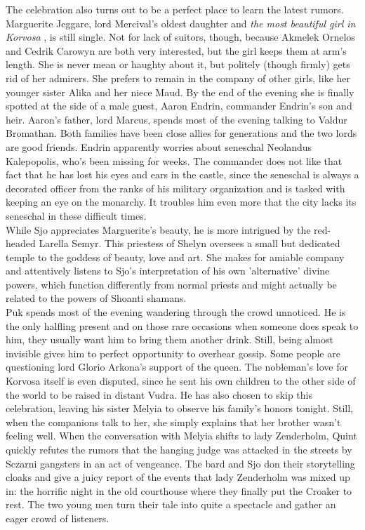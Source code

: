 The celebration also turns out to be a perfect place to learn the latest rumors. Marguerite Jeggare, lord Mercival's oldest daughter and {\itshape the most beautiful girl in Korvosa} , is still single. Not for lack of suitors, though, because Akmelek Ornelos and Cedrik Carowyn are both very interested, but the girl keeps them at arm's length. She is never mean or haughty about it, but politely (though firmly) gets rid of her admirers. She prefers to remain in the company of other girls, like her younger sister Alika and her niece Maud. By the end of the evening she is finally spotted at the side of a male guest, Aaron Endrin, commander Endrin's son and heir. Aaron's father, lord Marcus, spends most of the evening talking to Valdur Bromathan. Both families have been close allies for generations and the two lords are good friends. Endrin apparently worries about seneschal Neolandus Kalepopolis, who's been missing for weeks. The commander does not like that fact that he has lost his eyes and ears in the castle, since the seneschal is always a decorated officer from the ranks of his military organization and is tasked with keeping an eye on the monarchy. It troubles him even more that the city lacks its seneschal in these difficult times.\\

While Sjo appreciates Marguerite's beauty, he is more intrigued by the red-headed Larella Semyr. This priestess of Shelyn oversees a small but dedicated temple to the goddess of beauty, love and art. She makes for amiable company and attentively listens to Sjo's interpretation of his own 'alternative' divine powers, which function differently from normal priests and might actually be related to the powers of Shoanti shamans.\\

Puk spends most of the evening wandering through the crowd unnoticed. He is the only halfling present and on those rare occasions when someone does speak to him, they usually want him to bring them another drink. Still, being almost invisible gives him to perfect opportunity to overhear gossip. Some people are questioning lord Glorio Arkona's support of the queen. The nobleman's love for Korvosa itself is even disputed, since he sent his own children to the other side of the world to be raised in distant Vudra. He has also chosen to skip this celebration, leaving his sister Melyia to observe his family's honors tonight. Still, when the companions talk to her, she simply explains that her brother wasn't feeling well. When the conversation with Melyia shifts to lady Zenderholm, Quint quickly refutes the rumors that the hanging judge was attacked in the streets by Sczarni gangsters in an act of vengeance. The bard and Sjo don their storytelling cloaks and give a juicy report of the events that lady Zenderholm was mixed up in: the horrific night in the old courthouse where they finally put the Croaker to rest. The two young men turn their tale into quite a spectacle and gather an eager crowd of listeners.\\

